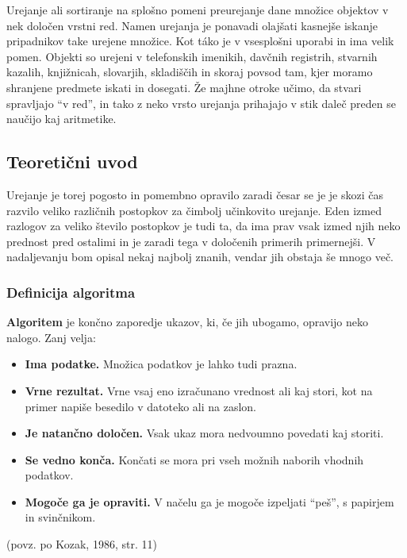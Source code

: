 \documentclass[a4paper,oneside,12pt]{article}
\begin{document}
Urejanje ali sortiranje na splošno pomeni preurejanje dane množice objektov
v nek določen vrstni red.
Namen urejanja je ponavadi olajšati kasnejše iskanje pripadnikov take urejene
množice. Kot t\'{a}ko je
v vsesplošni uporabi in ima velik pomen. Objekti so urejeni v telefonskih imenikih,
davčnih registrih, stvarnih kazalih, knjižnicah, slovarjih, skladiščih in skoraj povsod tam,
kjer moramo shranjene predmete iskati in dosegati. Že majhne otroke učimo, da stvari spravljajo
``v red'', in tako z neko vrsto urejanja prihajajo v stik daleč preden se naučijo kaj
aritmetike.

\subsection{Teoretični uvod}
\label{chapter:teoreticni}
Urejanje je torej pogosto in pomembno opravilo zaradi česar se je je skozi čas
razvilo veliko različnih postopkov za čimbolj učinkovito urejanje. Eden izmed razlogov za
veliko število postopkov je tudi ta, da ima prav vsak izmed njih neko prednost pred ostalimi in je
zaradi tega v določenih primerih primernejši. V nadaljevanju bom opisal nekaj najbolj znanih, 
vendar jih obstaja še mnogo več. 

\subsubsection{Definicija algoritma}

\begin{definicija}
\textbf{Algoritem} je končno zaporedje ukazov, ki, če jih ubogamo, opravijo neko nalogo.
Zanj velja:
\begin{itemize}
  \item \textbf{Ima podatke.} Množica podatkov je lahko tudi prazna.
  \item \textbf{Vrne rezultat.} Vrne vsaj eno izračunano vrednost ali kaj stori, kot na primer
    napiše besedilo v datoteko ali na zaslon.
  \item \textbf{Je natančno določen.} Vsak ukaz mora nedvoumno povedati kaj storiti.
  \item \textbf{Se vedno konča.} Končati se mora pri vseh možnih naborih vhodnih podatkov.
  \item \textbf{Mogoče ga je opraviti.} V načelu ga je mogoče izpeljati ``peš'', s papirjem in
    svinčnikom.
\end{itemize}
\end{definicija}
(povz. po Kozak, 1986, str. 11)
\end{document}
